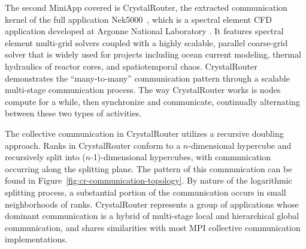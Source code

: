 
The second MiniApp covered is CrystalRouter, the extracted communication kernel of the full application Nek5000~\cite{crystalrouter}, which is a spectral element CFD application developed at Argonne National Laboratory \cite{nek5000}. It features spectral element multi-grid solvers coupled with a highly scalable, parallel coarse-grid solver that is widely used for projects including ocean current modeling, thermal hydraulics of reactor cores, and spatiotemporal chaos. CrystalRouter demonstrates the ``many-to-many'' communication pattern through a scalable multi-stage communication process. The way CrystalRouter works is nodes compute for a while, then synchronize and communicate, continually alternating between these two types of activities.

The collective communication in CrystalRouter utilizes a recursive doubling approach. Ranks in CrystalRouter conform to a $n$-dimensional hypercube and recursively split into ($n$-1)-dimensional hypercubes, with communication occurring along the splitting plane. The pattern of this communication can be found in Figure~\ref{fig:cr-communication-topology}. By nature of the logarithmic splitting process, a substantial portion of the communication occurs in small neighborhoods of ranks. CrystalRouter represents a group of applications whose dominant communication is a hybrid of multi-stage local and hierarchical global communication, and shares similarities with most MPI collective communication implementations.


